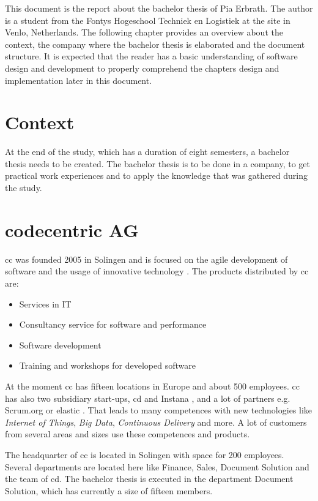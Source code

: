 This document is the report about the bachelor thesis of Pia Erbrath. The author is a student from the Fontys Hogeschool Techniek en Logistiek at the site in Venlo, Netherlands. The following chapter provides an overview about the context, the company where the bachelor thesis is elaborated and the document structure. \newline
It is expected that the reader has a basic understanding of software design and development to properly comprehend the chapters design and implementation later in this document. 

\section{Context}
At the end of the study, which has a duration of eight semesters, a bachelor thesis needs to be created. The bachelor thesis is to be done in a company, to get practical work experiences and to apply the knowledge that was\label{is} gathered during the study.  

\section{codecentric AG}
\Gls{cc} was founded 2005 in Solingen and is focused on the agile development of software and the usage of innovative technology \parencite{codecentric2018unternehmen}. The products distributed by \gls{cc} are: 
\begin{itemize}
	\item Services in \gls{IT}
	\item Consultancy service for software and performance
	\item Software development
	\item Training and workshops for developed software
\end{itemize}
At the moment \gls{cc} has fifteen locations in Europe and about 500 employees. \Gls{cc} has also two subsidiary start-ups, \gls{cd} and Instana \parencite{codecentric2018startups}, and a lot of partners e.g. Scrum.org or elastic \parencite{codecentric2018partner}.
That leads to many competences with new technologies like \textit{Internet of Things}, \textit{Big Data}, \textit{Continuous Delivery} and more.
A lot of customers from several areas and sizes use these competences and products.

The headquarter of \gls{cc} is located in Solingen with space for 200 employees. Several departments are located here like Finance, Sales, Document Solution and the team of \gls{cd}.   
The bachelor thesis is executed in the department Document Solution, which has currently a size of fifteen members.

